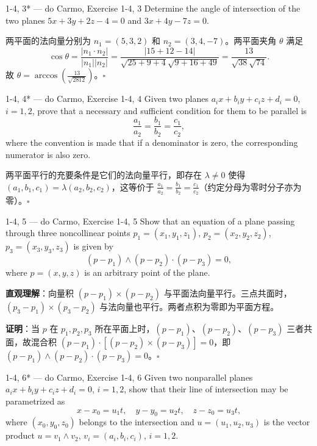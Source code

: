 \begin{exercise}{1-4, 3* — do Carmo, Exercise 1-4, 3}
Determine the angle of intersection of the two planes $5x + 3y + 2z - 4 = 0$ and $3x + 4y - 7z = 0$.
\end{exercise}

\begin{solution}
两平面的法向量分别为 $n_1 = (5,3,2)$ 和 $n_2 = (3,4,-7)$。两平面夹角 $\theta$ 满足
\[
\cos\theta = \frac{|n_1 \cdot n_2|}{|n_1||n_2|} = \frac{|15+12-14|}{\sqrt{25+9+4}\sqrt{9+16+49}} = \frac{13}{\sqrt{38}\sqrt{74}}.
\]
故 $\theta = \arccos\left(\frac{13}{\sqrt{2812}}\right)$。$\square$
\end{solution}

\begin{exercise}{1-4, 4* — do Carmo, Exercise 1-4, 4}
Given two planes $a_i x + b_i y + c_i z + d_i = 0$, $i = 1, 2$, prove that a necessary and sufficient condition for them to be parallel is
\[
\frac{a_1}{a_2} = \frac{b_1}{b_2} = \frac{c_1}{c_2},
\]
where the convention is made that if a denominator is zero, the corresponding numerator is also zero.
\end{exercise}

\begin{solution}
两平面平行的充要条件是它们的法向量平行，即存在 $\lambda \neq 0$ 使得 $(a_1,b_1,c_1) = \lambda(a_2,b_2,c_2)$，这等价于 $\frac{a_1}{a_2} = \frac{b_1}{b_2} = \frac{c_1}{c_2}$（约定分母为零时分子亦为零）。$\square$
\end{solution}

\begin{exercise}{1-4, 5 — do Carmo, Exercise 1-4, 5}
Show that an equation of a plane passing through three noncollinear points $p_1 = (x_1, y_1, z_1)$, $p_2 = (x_2, y_2, z_2)$, $p_3 = (x_3, y_3, z_3)$ is given by
\[
(p - p_1) \wedge (p - p_2) \cdot (p - p_3) = 0,
\]
where $p = (x, y, z)$ is an arbitrary point of the plane.
\end{exercise}

\begin{solution}
\textbf{直观理解}：向量积 $(p-p_1)\times(p-p_2)$ 与平面法向量平行。三点共面时，$(p_3-p_1)\times(p_3-p_2)$ 与法向量也平行。两者点积为零即为平面方程。

\textbf{证明}：当 $p$ 在 $p_1,p_2,p_3$ 所在平面上时，$(p-p_1)$、$(p-p_2)$、$(p-p_3)$ 三者共面，故混合积 $(p-p_1)\cdot[(p-p_2)\times(p-p_3)] = 0$，即 $(p-p_1)\wedge(p-p_2)\cdot(p-p_3) = 0$。$\square$
\end{solution}

\begin{exercise}{1-4, 6* — do Carmo, Exercise 1-4, 6}
Given two nonparallel planes $a_i x + b_i y + c_i z + d_i = 0$, $i = 1, 2$, show that their line of intersection may be parametrized as
\[
x - x_0 = u_1 t, \quad y - y_0 = u_2 t, \quad z - z_0 = u_3 t,
\]
where $(x_0, y_0, z_0)$ belongs to the intersection and $u = (u_1, u_2, u_3)$ is the vector product $u = v_1 \wedge v_2$, $v_i = (a_i, b_i, c_i)$, $i = 1, 2$.
\end{exercise}

